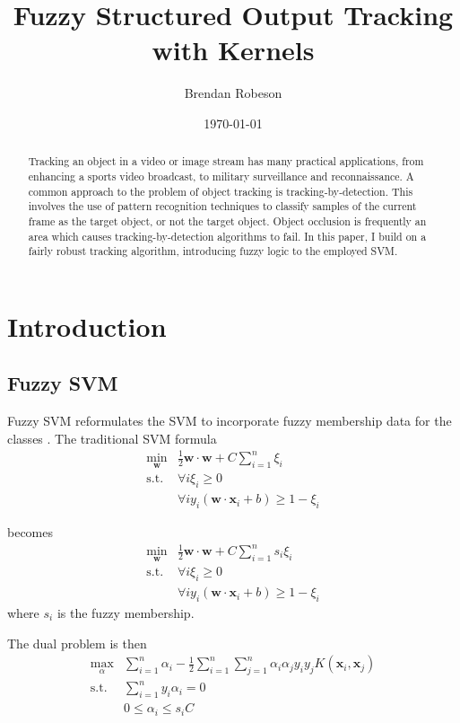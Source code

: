 \documentclass{IEEEtran}
\renewcommand{\vec}[1]{\mathbf{#1}}
\newcommand{\half}{\frac{1}{2}}
\begin{document}
\title{Fuzzy Structured Output Tracking with Kernels}
\author{Brendan Robeson}
\date{\today}
\maketitle

\begin{abstract} %
    Tracking an object in a video or image stream has many practical applications, from enhancing a
    sports video broadcast, to military surveillance and reconnaissance. A common approach to the
    problem of object tracking is tracking-by-detection. This involves the use of pattern
    recognition techniques to classify samples of the current frame as the target object, or not the
    target object. Object occlusion is frequently an area which causes tracking-by-detection
    algorithms to fail. In this paper, I build on a fairly robust tracking algorithm, introducing
    fuzzy logic to the employed SVM.
\end{abstract}

\section{Introduction} %
\subsection{Fuzzy SVM} %
Fuzzy SVM reformulates the SVM to incorporate fuzzy membership data for the classes \cite{991432}. The
traditional SVM formula
\begin{align}
    \min_\vec{w} & \half \vec{w} \cdot \vec{w} + C\sum_{i=1}^n\xi_i \\
    \text{s.t. } & \forall i \xi_i \ge 0 \nonumber \\
                 & \forall i y_i \left(\vec{w} \cdot \vec{x}_i + b\right) \ge 1 - \xi_i \nonumber
\end{align}

becomes
\begin{align}
    \min_\vec{w} & \half \vec{w} \cdot \vec{w} + C\sum_{i=1}^ns_i\xi_i \\
    \text{s.t. } & \forall i \xi_i \ge 0 \nonumber \\
                 & \forall i y_i \left(\vec{w} \cdot \vec{x}_i + b\right) \ge 1 - \xi_i \nonumber
\end{align}
where \(s_i\) is the fuzzy membership.

The dual problem is then
\begin{align}
    \max_\alpha & \sum_{i=1}^n \alpha_i - \half \sum_{i=1}^n \sum_{j=1}^n \alpha_i \alpha_j
    y_i y_j K\left(\vec{x}_i, \vec{x}_j\right) \\
    \text{s.t. } & \sum_{i=1}^n y_i \alpha_i = 0 \nonumber \\
                 & 0 \le \alpha_i \le s_iC \nonumber
\end{align}
\end{document}
